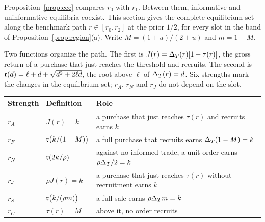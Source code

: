 Proposition~\ref{prop:ccc} compares \(r_0\) with \(r_1\). Between them, informative and uninformative equilibria
coexist. This section gives the complete equilibrium set along the benchmark path \(r\in[r_0,r_2]\) at the prior
\(1/2\), for every slot in the band of Proposition~\ref{prop:region}(a). Write \(M=(1+u)/(2+u)\) and \(m=1-M\).

Two functions organize the path. The first is \(J(r)=\Delta_T(r)[1-\tau(r)]\), the gross return of a purchase that just
reaches the threshold and recruits. The second is \(\mathfrak{r}(d)=\ell+d+\sqrt{d^2+2\ell d}\), the root above \(\ell\) of
\(\Delta_T(r)=d\). Six strengths mark the changes in the equilibrium set; \(r_A\), \(r_N\) and \(r_J\) do not depend on
the slot.
\begin{center}\small\singlespacing
\begin{tabular}{@{}lll@{}}
\toprule
Strength & Definition & Role\\
\midrule
\(r_A\) & \(J(r)=k\) & a purchase that just reaches \(\tau(r)\) and recruits earns \(k\)\\
\(r_F\) & \(\mathfrak{r}\bigl(k/(1-M)\bigr)\) & a full purchase that recruits earns \(\Delta_T(1-M)=k\)\\
\(r_N\) & \(\mathfrak{r}(2k/\rho)\) & against no informed trade, a unit order earns \(\rho\Delta_T/2=k\)\\
\(r_J\) & \(\rho J(r)=k\) & a purchase that just reaches \(\tau(r)\) without recruitment earns \(k\)\\
\(r_S\) & \(\mathfrak{r}\bigl(k/(\rho m)\bigr)\) & a full sale earns \(\rho\Delta_T m=k\)\\
\(r_C\) & \(\tau(r)=M\) & above it, no order recruits\\
\bottomrule
\end{tabular}
\end{center}


